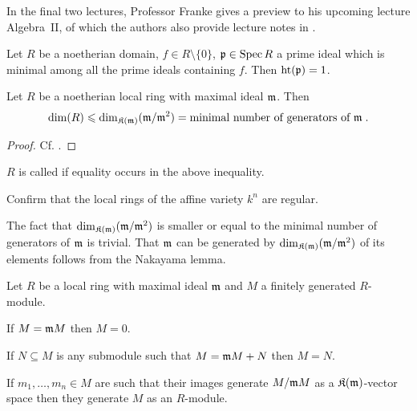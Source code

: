 \documentclass[a4paper,parskip=half,numbers=enddot, DIV=12]{scrreprt}
\renewcommand{\leq}{\leqslant}
\begin{document}
	In the final two lectures, Professor Franke gives a preview to his upcoming lecture Algebra~II, of which the authors also provide lecture notes in \cite{alg2}.
	\begin{thm}
		Let $R$ be a noetherian domain, $f\in R\setminus\{0\}$, $\mathfrak{p}\in \operatorname{Spec} R$ a prime ideal which is minimal among all the prime ideals containing $f$. Then $\operatorname{ht}(\mathfrak{p}) = 1$.
	\end{thm}
	\begin{cor}
		Let $R$ be a noetherian local ring with maximal ideal $\mathfrak{m}$. Then
		\begin{align*}
			\dim (R)\leq\dim_{\KK(\mm)}(\mm/\mm^2)=\text{minimal number of generators of }\mm\;. 
		\end{align*}
	\end{cor}
	\begin{proof}
		Cf. \cite[Proposition~1.3.1]{alg2}.
	\end{proof}
	\begin{defi}
		$R$ is called  if equality occurs in the above inequality.
	\end{defi}
	\begin{exc}
		Confirm that the local rings of the affine variety $k^n$ are regular.
	\end{exc}
	The fact that $\dim_{\mathfrak{K}(\mathfrak{m})}(\mathfrak{m}/\mathfrak{m}^2)$ is smaller or equal to the minimal number of generators of $\mathfrak{m}$ is trivial. That $\mathfrak{m}$ can be generated by $\dim_{\mathfrak{K}(\mathfrak{m})}(\mathfrak{m}/\mathfrak{m}^2)$ of its elements follows from the Nakayama lemma.
	\begin{lem}
		Let $R$ be a local ring with maximal ideal $\mathfrak{m}$ and $M$ a finitely generated $R$-module.
		\begin{alphanumerate}
		\item
			If $M = \mathfrak{m} M$ then $M=0$.
		\item 
			If $N\subseteq M$ is any submodule such that $M = \mathfrak{m} M +N$ then $M=N$.
		\item 
			If $m_1,\ldots, m_n\in M$ are such that their images generate $M/\mathfrak{m} M$ as a $\mathfrak{K}(\mathfrak{m})$-vector space then they generate $M$ as an $R$-module.
		\end{alphanumerate}

	\end{lem}
\end{document}
